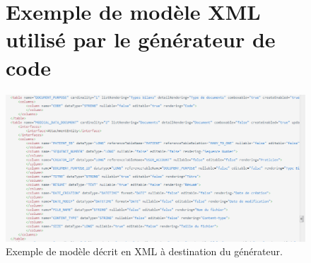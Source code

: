 \begin{appendices}
\begin{figure}[H]
\section*{Exemple de modèle XML utilisé par le générateur de code}
  \centering
  \includegraphics[width=18cm]{./img/modele_generateur}
  \caption{\label{fig:xml} Exemple de modèle décrit en XML à destination du générateur.}
\end{figure}

\begin{figure}[H]

\end{figure}
\end{appendices}
